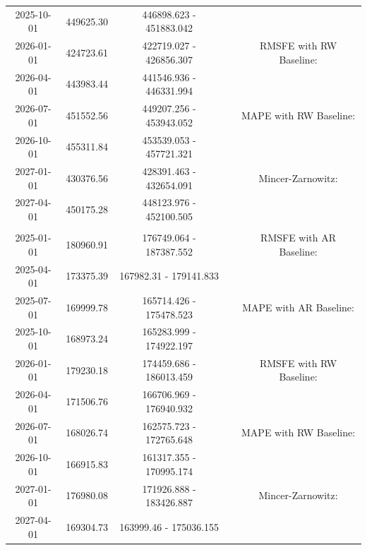 \begin{table}
\begin{tabular}[t]{ccccc}
\hspace{1em}2025-10-01 & 449625.30 & 446898.623 - 451883.042 &  & \\
\hspace{1em}2026-01-01 & 424723.61 & 422719.027 - 426856.307 &  & RMSFE with RW Baseline:\\
\hspace{1em}2026-04-01 & 443983.44 & 441546.936 - 446331.994 &  & \\
\hspace{1em}2026-07-01 & 451552.56 & 449207.256 - 453943.052 &  & MAPE with RW Baseline:\\
\hspace{1em}2026-10-01 & 455311.84 & 453539.053 - 457721.321 &  & \\
\hspace{1em}2027-01-01 & 430376.56 & 428391.463 - 432654.091 &  & Mincer-Zarnowitz:\\
\hspace{1em}2027-04-01 & 450175.28 & 448123.976 - 452100.505 &  & \\
\addlinespace[0.3em]
\multicolumn{5}{l}{\textbf{RealVAIndustry}}\\
\hspace{1em}2025-01-01 & 180960.91 & 176749.064 - 187387.552 &  & RMSFE with AR Baseline:\\
\hspace{1em}2025-04-01 & 173375.39 & 167982.31 - 179141.833 &  & \\
\hspace{1em}2025-07-01 & 169999.78 & 165714.426 - 175478.523 &  & MAPE with AR Baseline:\\
\hspace{1em}2025-10-01 & 168973.24 & 165283.999 - 174922.197 &  & \\
\hspace{1em}2026-01-01 & 179230.18 & 174459.686 - 186013.459 &  & RMSFE with RW Baseline:\\
\hspace{1em}2026-04-01 & 171506.76 & 166706.969 - 176940.932 &  & \\
\hspace{1em}2026-07-01 & 168026.74 & 162575.723 - 172765.648 &  & MAPE with RW Baseline:\\
\hspace{1em}2026-10-01 & 166915.83 & 161317.355 - 170995.174 &  & \\
\hspace{1em}2027-01-01 & 176980.08 & 171926.888 - 183426.887 &  & Mincer-Zarnowitz:\\
\hspace{1em}2027-04-01 & 169304.73 & 163999.46 - 175036.155 &  & \\
\bottomrule
\end{tabular}
\end{table}
